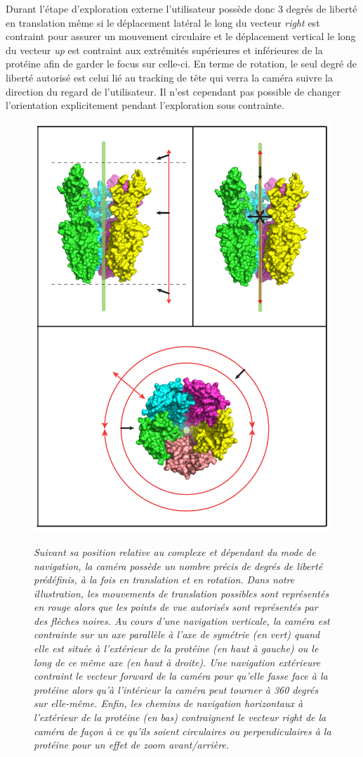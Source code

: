 Durant l'étape d'exploration externe l'utilisateur possède donc 3 degrés de liberté en translation même si le déplacement latéral le long du vecteur \textit{right} est contraint pour assurer un mouvement circulaire et le déplacement vertical le long du vecteur \textit{up} est contraint aux extrémités supérieures et inférieures de la protéine afin de garder le focus sur celle-ci. En terme de rotation, le seul degré de liberté autorisé est celui lié au tracking de tête qui verra la caméra suivre la direction du regard de l'utilisateur. Il n'est cependant pas possible de changer l'orientation explicitement pendant l'exploration sous contrainte.

\begin{figure}[h]
  \centering
  {\includegraphics[width=.5\linewidth]{./figures/ch3/degree_of_freedom_glic}}
    \caption{{\it Suivant sa position relative au complexe et dépendant du mode de navigation, la caméra possède un nombre précis de degrés de liberté prédéfinis, à la fois en translation et en rotation. Dans notre illustration, les mouvements de translation possibles sont représentés en rouge alors que les points de vue autorisés sont représentés par des flèches noires. Au cours d'une navigation verticale, la caméra est contrainte sur un axe parallèle à l'axe de symétrie (en vert) quand elle est située à l'extérieur de la protéine (en haut à gauche) ou le long de ce même axe (en haut à droite). Une navigation extérieure contraint le vecteur forward de la caméra pour qu'elle fasse face à la protéine alors qu'à l'intérieur la caméra peut tourner à 360 degrés sur elle-même. Enfin, les chemins de navigation horizontaux à l'extérieur de la protéine (en bas) contraignent le vecteur right de la caméra de façon à ce qu'ils soient circulaires ou perpendiculaires à la protéine pour un effet de zoom avant/arrière.}}
  \label{Fig:degree_of_freedom_glic}
  \hspace{0.2cm}
\end{figure}

